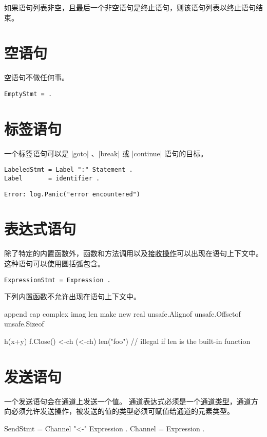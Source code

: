 如果语句列表非空，且最后一个非空语句是终止语句，则该语句列表以终止语句结束。

\section{空语句}
空语句不做任何事。
\begin{lstlisting}[style=EBNF, language=EBNF]
EmptyStmt = .
\end{lstlisting}

\section{标签语句}
一个标签语句可以是 \code|goto| 、\code|break| 或 \code|continue| 语句的目标。
\begin{lstlisting}[style=EBNF, language=EBNF]
LabeledStmt = Label ":" Statement .
Label       = identifier .
\end{lstlisting}

\begin{lstlisting}[language=golang, style=golang]
Error: log.Panic("error encountered")
\end{lstlisting}

\section{表达式语句}\label{sec:expression statements}
除了特定的内置函数外，函数和方法调用以及\hyperref[sec:recv operator]{接收操作}可以出现在语句上下文中。这种语句可以使用圆括弧包含。
\begin{lstlisting}[style=EBNF, language=EBNF]
ExpressionStmt = Expression .
\end{lstlisting}

下列内置函数不允许出现在语句上下文中。
\begin{goblock}
append cap complex imag len make new real
unsafe.Alignof unsafe.Offsetof unsafe.Sizeof
\end{goblock}

\begin{goblock}
h(x+y)
f.Close()
<-ch
(<-ch)
len("foo")  // illegal if len is the built-in function
\end{goblock}

\section{发送语句} \label{sec:send statement}
一个发送语句会在通道上发送一个值。
通道表达式必须是一个\hyperref[sec:channel type]{通道类型}，通道方向必须允许发送操作，被发送的值的类型必须可赋值给通道的元素类型。
\begin{EBNF}
SendStmt = Channel "<-" Expression .
Channel  = Expression .
\end{EBNF}

